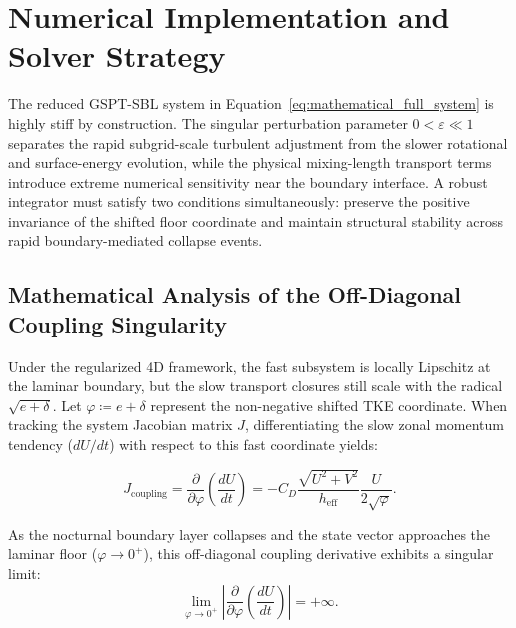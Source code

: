 \documentclass[11pt,letterpaper]{article}
\begin{document}

\section{Numerical Implementation and Solver Strategy}
\label{sec:numerical_implementation}

The reduced GSPT-SBL system in Equation~\eqref{eq:mathematical_full_system} is highly stiff by construction. The singular perturbation parameter $0 < \varepsilon \ll 1$ separates the rapid subgrid-scale turbulent adjustment from the slower rotational and surface-energy evolution, while the physical mixing-length transport terms introduce extreme numerical sensitivity near the boundary interface. A robust integrator must satisfy two conditions simultaneously: preserve the positive invariance of the shifted floor coordinate and maintain structural stability across rapid boundary-mediated collapse events.

\subsection{Mathematical Analysis of the Off-Diagonal Coupling Singularity}
\label{subsec:singularity_analysis}

Under the regularized 4D framework, the fast subsystem is locally Lipschitz at the laminar boundary, but the slow transport closures still scale with the radical $\sqrt{e+\delta}$. Let $\varphi \coloneqq e + \delta$ represent the non-negative shifted TKE coordinate. When tracking the system Jacobian matrix $J$, differentiating the slow zonal momentum tendency ($dU/dt$) with respect to this fast coordinate yields:

\begin{equation}
J_{\text{coupling}} = \frac{\partial}{\partial \varphi} \left( \frac{dU}{dt} \right) = -C_D \frac{\sqrt{U^2+V^2}}{h_{\mathrm{eff}}} \frac{U}{2\sqrt{\varphi}}.
\label{eq:coupling_jacobian_element}
\end{equation}

As the nocturnal boundary layer collapses and the state vector approaches the laminar floor ($\varphi \to 0^+$), this off-diagonal coupling derivative exhibits a singular limit:
\begin{equation}
\lim_{\varphi \to 0^+} \left| \frac{\partial}{\partial \varphi} \left( \frac{dU}{dt} \right) \right| = +\infty.
\label{eq:coupling_singularity}
\end{equation}
\end{document}
